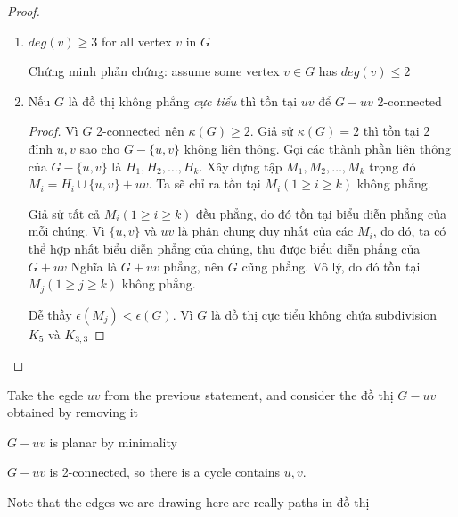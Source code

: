 \begin{proof}
\begin{enumerate}
\begin{proof}
                  Vậy, nếu $G$ là đồ thị không phẳng cực tiểu thì $G$ 2-connected.

              \end{proof}
        \item $deg(v) \geq 3$ for all vertex $v$ in $G$

              Chứng minh phản chứng: assume some vertex $v \in G$ has $deg(v) \leq 2$

        \item Nếu $G$ là đồ thị không phẳng \textit{cực tiểu} thì tồn tại $uv$ để $G-uv$ 2-connected
              \begin{proof}
                  Vì $G$ 2-connected nên $\kappa(G) \geq 2$. Giả sử $\kappa(G) =2$ thì tồn tại 2 đỉnh $u,v$ sao cho $G-\{u,v\}$ không liên thông.
                  Gọi các thành phần liên thông của $G-\{u,v\}$ là $H_1, H_2, \ldots,H_k$. Xây dựng tập $M_1,M_2,\ldots,M_k$ trọng đó $M_i=H_i \cup \{u,v\} +uv$.
                  Ta sẽ chỉ ra tồn tại $M_i (1 \geq i \geq k)$ không phẳng.

                  Giả sử tất cả $M_i (1 \geq i \geq k)$ đều phẳng, do đó tồn tại biểu diễn phẳng của mỗi chúng.
                  Vì $\{u,v\}$ và $uv$ là phân chung duy nhất của các $M_i$, do đó, ta có thể hợp nhất biểu diễn phẳng của chúng, thu được biểu diễn phẳng của $G+uv$
                  Nghĩa là $G+uv$ phẳng, nên $G$ cũng phẳng. Vô lý, do đó tồn tại $M_j (1 \geq j \geq k)$ không phẳng.

                  Dễ thầy $\epsilon(M_j) < \epsilon(G)$. Vì $G$ là đồ thị cực tiểu không chứa subdivision $K_5$ và $K_{3,3}$

              \end{proof}
              \begin{tikzpicture}

              \end{tikzpicture}
    \end{enumerate}

\end{proof}

Take the egde $uv$ from the previous statement, and consider the đồ thị $G-uv$ obtained by removing it

$G-uv$ is planar by minimality

$G-uv$ is 2-connected, so there is a cycle contains $u,v$.

\begin{remark}
    Note that the edges we are drawing here are really paths in đồ thị
\end{remark}

